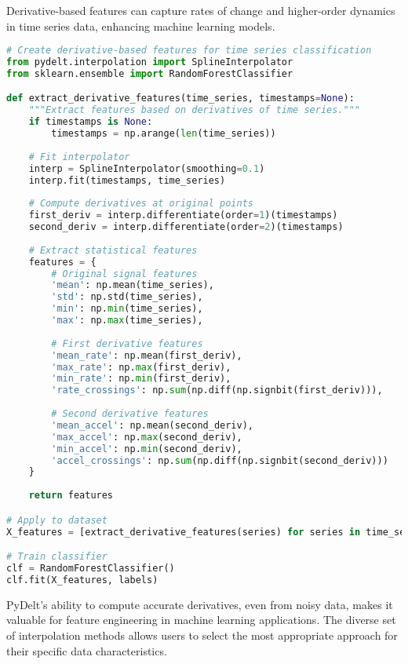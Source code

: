 \documentclass[11pt,a4paper]{article}
\begin{document}
Derivative-based features can capture rates of change and higher-order dynamics in time series data, enhancing machine learning models.

\begin{lstlisting}[language=Python, caption=Feature engineering example]
# Create derivative-based features for time series classification
from pydelt.interpolation import SplineInterpolator
from sklearn.ensemble import RandomForestClassifier

def extract_derivative_features(time_series, timestamps=None):
    """Extract features based on derivatives of time series."""
    if timestamps is None:
        timestamps = np.arange(len(time_series))
    
    # Fit interpolator
    interp = SplineInterpolator(smoothing=0.1)
    interp.fit(timestamps, time_series)
    
    # Compute derivatives at original points
    first_deriv = interp.differentiate(order=1)(timestamps)
    second_deriv = interp.differentiate(order=2)(timestamps)
    
    # Extract statistical features
    features = {
        # Original signal features
        'mean': np.mean(time_series),
        'std': np.std(time_series),
        'min': np.min(time_series),
        'max': np.max(time_series),
        
        # First derivative features
        'mean_rate': np.mean(first_deriv),
        'max_rate': np.max(first_deriv),
        'min_rate': np.min(first_deriv),
        'rate_crossings': np.sum(np.diff(np.signbit(first_deriv))),
        
        # Second derivative features
        'mean_accel': np.mean(second_deriv),
        'max_accel': np.max(second_deriv),
        'min_accel': np.min(second_deriv),
        'accel_crossings': np.sum(np.diff(np.signbit(second_deriv)))
    }
    
    return features

# Apply to dataset
X_features = [extract_derivative_features(series) for series in time_series_dataset]

# Train classifier
clf = RandomForestClassifier()
clf.fit(X_features, labels)
\end{lstlisting}

PyDelt's ability to compute accurate derivatives, even from noisy data, makes it valuable for feature engineering in machine learning applications. The diverse set of interpolation methods allows users to select the most appropriate approach for their specific data characteristics.
\end{document}
